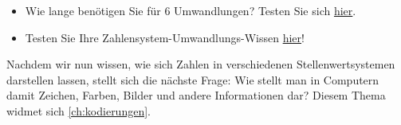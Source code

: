 \begin{mychallenge}\label{challenge:online}
	\begin{itemize}
		\item Wie lange benötigen Sie für 6 Umwandlungen? Testen Sie sich \href{https://oinf.ch/interactive/umrechnen-zwischen-zahlensystemen/}{hier}.
		\item Testen Sie Ihre Zahlensystem-Umwandlungs-Wissen \href{https://oinf.ch/interactive/basiswechsel-10-zu-2/}{hier}!
	\end{itemize}
\end{mychallenge}

Nachdem wir nun wissen, wie sich Zahlen in verschiedenen Stellenwertsystemen darstellen lassen, stellt sich die nächste Frage: Wie stellt man in Computern damit Zeichen, Farben, Bilder und andere Informationen dar? Diesem Thema widmet sich \cref{ch:kodierungen}.

